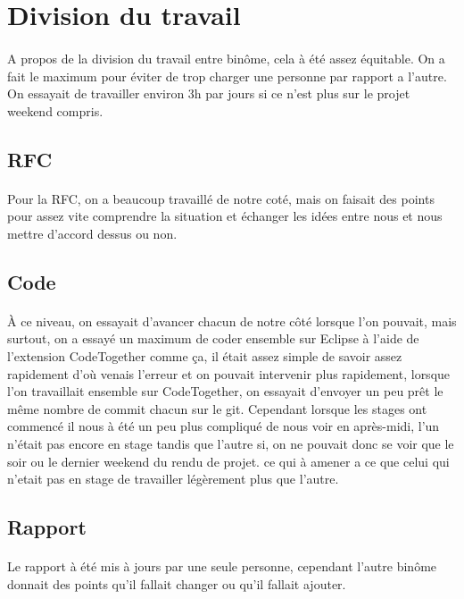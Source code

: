 \documentclass[a4paper,titlepage]{report}
\begin{document}
\pagebreak
\section{Division du travail}
\paragraph{}
A propos de la division du travail entre binôme, cela à été assez équitable. On a fait le maximum pour éviter de trop charger une personne par rapport a l'autre. On essayait de travailler environ 3h par jours si ce n'est plus sur le projet weekend compris.
\subsection{RFC}
\paragraph{}
Pour la RFC, on a beaucoup travaillé de notre coté, mais on faisait des points pour assez vite comprendre la situation et échanger les idées entre nous et nous mettre d'accord dessus ou non.
\subsection{Code}
\paragraph{}
À ce niveau, on essayait d'avancer chacun de notre côté lorsque l'on pouvait, mais surtout, on a essayé un maximum de coder ensemble sur Eclipse à l'aide de l'extension CodeTogether comme ça, il était assez simple de savoir assez rapidement d'où venais l'erreur et on pouvait intervenir plus rapidement, lorsque l'on travaillait ensemble sur CodeTogether, on essayait d'envoyer un peu prêt le même nombre de commit chacun sur le git. Cependant lorsque les stages ont commencé il nous à été un peu plus compliqué de nous voir en après-midi, l'un n'était pas encore en stage tandis que l'autre si, on ne pouvait donc se voir que le soir ou le dernier weekend du rendu de projet. ce qui à amener a ce que celui qui n'etait pas en stage de travailler légèrement plus que l'autre.
\subsection{Rapport}
\paragraph{}
Le rapport à été mis à jours par une seule personne, cependant l'autre binôme donnait des points qu'il fallait changer ou qu'il fallait ajouter.
\end{document}
